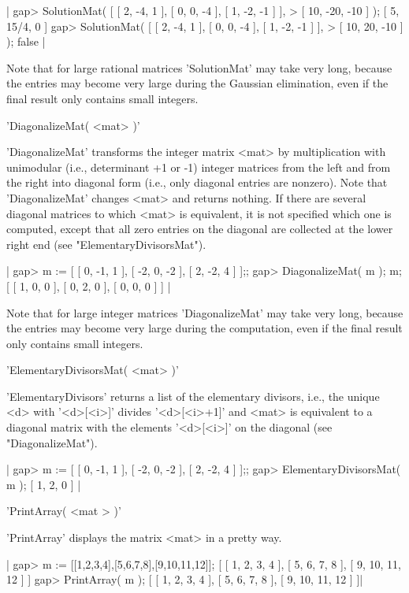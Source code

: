 |    gap> SolutionMat( [ [ 2, -4, 1 ], [ 0, 0, -4 ], [ 1, -2, -1 ] ],
    >                  [ 10, -20, -10 ] );
    [ 5, 15/4, 0 ]
    gap> SolutionMat( [ [ 2, -4, 1 ], [ 0, 0, -4 ], [ 1, -2, -1 ] ],
    >                  [ 10, 20, -10 ] );
    false |

Note  that for large rational  matrices 'SolutionMat' may take very long,
because   the  entries  may   become  very  large   during  the  Gaussian
elimination, even if the final result only contains small integers.


'DiagonalizeMat( <mat> )'

'DiagonalizeMat'  transforms the  integer matrix <mat> by  multiplication
with unimodular  (i.e., determinant +1  or -1) integer matrices  from the
left  and from the right into diagonal form (i.e., only diagonal  entries
are  nonzero).  Note  that  'DiagonalizeMat'  changes <mat>  and  returns
nothing.  If  there  are  several  diagonal matrices  to  which  <mat> is
equivalent,  it is not  specified  which one is computed, except that all
zero entries  on  the diagonal are collected at the lower right  end (see
"ElementaryDivisorsMat").

|    gap> m := [ [ 0, -1, 1 ], [ -2, 0, -2 ], [ 2, -2, 4 ] ];;
    gap> DiagonalizeMat( m );  m;
    [ [ 1, 0, 0 ], [ 0, 2, 0 ], [ 0, 0, 0 ] ] |

Note that for large integer matrices 'DiagonalizeMat' may take very long,
because the entries may become very large during the computation, even if
the final result only contains small integers.


'ElementaryDivisorsMat( <mat> )'

'ElementaryDivisors' returns a list of the elementary divisors, i.e., the
unique <d> with '<d>[<i>]'  divides '<d>[<i>+1]'  and <mat> is equivalent
to a diagonal matrix  with the elements  '<d>[<i>]' on the  diagonal (see
"DiagonalizeMat").

|    gap> m := [ [ 0, -1, 1 ], [ -2, 0, -2 ], [ 2, -2, 4 ] ];;
    gap> ElementaryDivisorsMat( m );
    [ 1, 2, 0 ] |


'PrintArray( <mat > )'

'PrintArray' displays the matrix <mat> in a pretty way.

|    gap> m := [[1,2,3,4],[5,6,7,8],[9,10,11,12]];
    [ [ 1, 2, 3, 4 ], [ 5, 6, 7, 8 ], [ 9, 10, 11, 12 ] ]
    gap> PrintArray( m );
    [ [   1,   2,   3,   4 ],
      [   5,   6,   7,   8 ],
      [   9,  10,  11,  12 ] ]|

